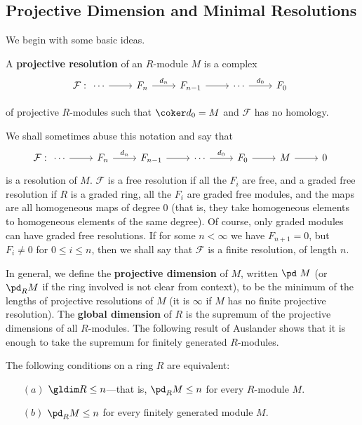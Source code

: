 \subsection{Projective Dimension and Minimal Resolutions}
We begin with some basic ideas.
\begin{definition}
A \textbf{projective resolution} of an $R$-module $M$ is a complex
\[\mathcal{F}:\begin{tikzcd}
\cdots\ar[r]&F_n\ar[r,"d_n"]&F_{n-1}\ar[r]&\cdots\ar[r,"d_0"]&F_0
\end{tikzcd}\]
\end{definition}
of projective $R$-modules such that $\coker d_0=M$ and $\mathcal{F}$ has no homology.\par
We shall sometimes abuse this notation and say that
\[\mathcal{F}:\begin{tikzcd}
\cdots\ar[r]&F_n\ar[r,"d_n"]&F_{n-1}\ar[r]&\cdots\ar[r,"d_0"]&F_0\ar[r]&M\ar[r]&0
\end{tikzcd}\]
is a resolution of $M$. $\mathcal{F}$ is a free resolution if all the $F_i$ are free, and a graded free resolution if $R$ is a graded ring, all the $F_i$ are graded free modules, and the maps are all homogeneous maps of degree $0$ (that is, they take homogeneous elements to homogeneous elements of the same degree). Of course, only graded modules can have graded free resolutions. If for some $n<\infty$ we have $F_{n+1}=0$, but $F_i\neq0$ for $0\leq i\leq n$, then we shall say that $\mathcal{F}$ is a finite resolution, of length $n$.\par
In general, we define the \textbf{projective dimension} of $M$, written $\pd\ M$ (or $\pd_RM$ if the ring involved is not clear from context), to be the minimum of the lengths of projective resolutions of $M$ (it is $\infty$ if $M$ has no finite projective resolution). The \textbf{global dimension} of $R$ is the supremum of the projective dimensions of all $R$-modules. The following result of Auslander shows that it is enough to take the supremum for finitely generated $R$-modules.
\begin{theorem}
The following conditions on a ring $R$ are equivalent:
\begin{itemize}
\item[$(a)$]$\gldim R\leq n$---that is, $\pd_RM\leq n$ for every $R$-module $M$.
\item[$(b)$]$\pd_RM\leq n$ for every finitely generated module $M$.
\end{itemize}
\end{theorem}
